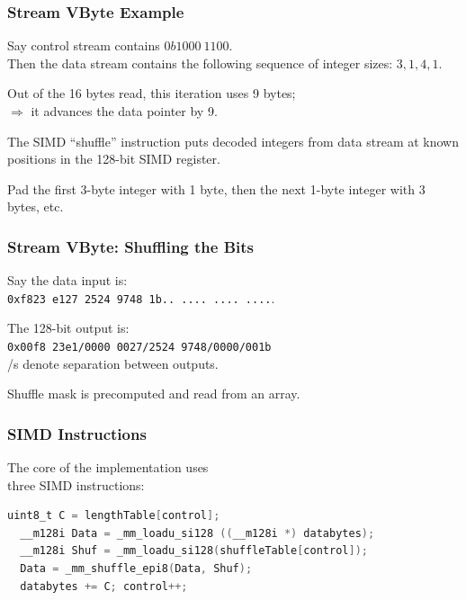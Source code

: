 \begin{frame}
\frametitle{Stream VByte Example}


Say control stream contains $0b1000~1100$. \\
Then the data stream
contains the following sequence of integer sizes: $3, 1, 4, 1$. 

Out of the 16 bytes read,
this iteration uses 9 bytes; \\
\hspace*{2em} $\Rightarrow$ it advances the data pointer by 9. 

The SIMD
``shuffle'' instruction puts decoded integers from data stream at known positions in the
128-bit SIMD register.

Pad the first 3-byte integer with 1 byte, then
the next 1-byte integer with 3 bytes, etc. 

\end{frame}

\begin{frame}
\frametitle{Stream VByte: Shuffling the Bits}
\vspace*{-1em}

Say the data input is:\\
{\tt 0xf823~e127~2524~9748~1b..~....~....~....}. 

The 128-bit output is:\\
{\tt 0x00f8~23e1/0000~0027/2524 9748/0000/001b}\\
/s denote separation
between outputs. 

Shuffle mask is precomputed and
read from an array.

\end{frame}

\begin{frame}[fragile]
\frametitle{SIMD Instructions}

\vspace*{-1em}

The core of the implementation uses\\
three SIMD instructions:
\begin{lstlisting}[language=C]
  uint8_t C = lengthTable[control];
  __m128i Data = _mm_loadu_si128 ((__m128i *) databytes);
  __m128i Shuf = _mm_loadu_si128(shuffleTable[control]);
  Data = _mm_shuffle_epi8(Data, Shuf);
  databytes += C; control++;
\end{lstlisting}

\end{frame}


